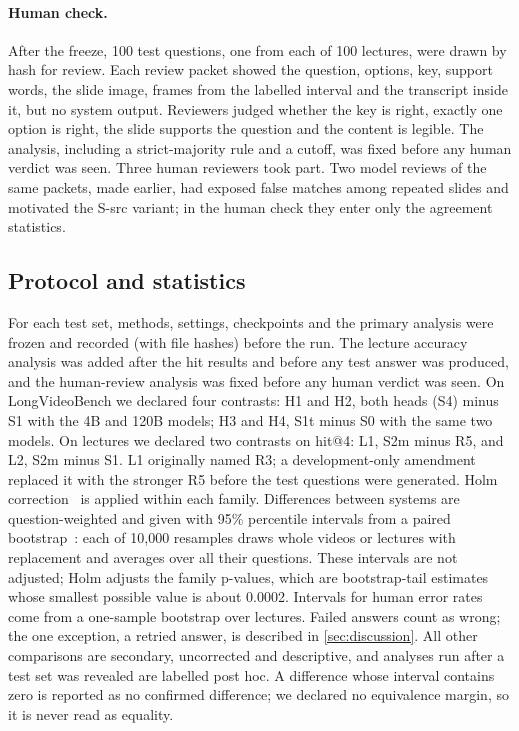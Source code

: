 \paragraph{Human check.}
After the freeze, 100 test questions, one from each of 100 lectures, were drawn by hash for review.
Each review packet showed the question, options, key, support words, the slide image, frames from the labelled interval and the transcript inside it, but no system output.
Reviewers judged whether the key is right, exactly one option is right, the slide supports the question and the content is legible.
The analysis, including a strict-majority rule and a cutoff, was fixed before any human verdict was seen.
Three human reviewers took part.
Two model reviews of the same packets, made earlier, had exposed false matches among repeated slides and motivated the S-src variant; in the human check they enter only the agreement statistics.

\subsection{Protocol and statistics}
\label{sec:protocol}
For each test set, methods, settings, checkpoints and the primary analysis were frozen and recorded (with file hashes) before the run.
The lecture accuracy analysis was added after the hit results and before any test answer was produced, and the human-review analysis was fixed before any human verdict was seen.
On LongVideoBench we declared four contrasts: H1 and H2, both heads (S4) minus S1 with the 4B and 120B models; H3 and H4, S1t minus S0 with the same two models.
On lectures we declared two contrasts on hit@4: L1, S2m minus R5, and L2, S2m minus S1.
L1 originally named R3; a development-only amendment replaced it with the stronger R5 before the test questions were generated.
Holm correction~\cite{holm1979} is applied within each family.
Differences between systems are question-weighted and given with 95\% percentile intervals from a paired bootstrap~\cite{efron1993bootstrap}: each of 10,000 resamples draws whole videos or lectures with replacement and averages over all their questions.
These intervals are not adjusted; Holm adjusts the family p-values, which are bootstrap-tail estimates whose smallest possible value is about 0.0002.
Intervals for human error rates come from a one-sample bootstrap over lectures.
Failed answers count as wrong; the one exception, a retried answer, is described in \cref{sec:discussion}.
All other comparisons are secondary, uncorrected and descriptive, and analyses run after a test set was revealed are labelled post hoc.
A difference whose interval contains zero is reported as no confirmed difference; we declared no equivalence margin, so it is never read as equality.
